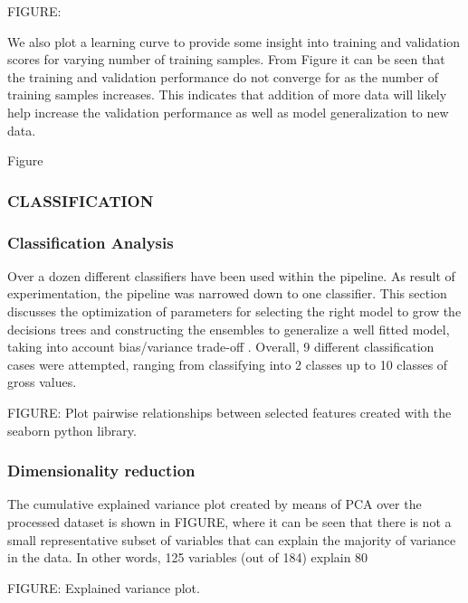 FIGURE:     


We also plot a learning curve to provide some insight into training and validation scores for varying number of training samples. From Figure  it can be seen that the training and validation performance do not converge for as the number of training samples increases. This indicates that addition of  more data will likely help increase the validation performance as well as model generalization to new data.


Figure

\subsubsection{CLASSIFICATION}

\subsubsection{Classification Analysis}
Over a dozen different classifiers have been used within the pipeline. As result of experimentation, the pipeline was narrowed down to one classifier. This section discusses the optimization of parameters for selecting the right model to grow the decisions trees and constructing the ensembles to generalize a well fitted model, taking into account bias/variance trade-off \cite{biasvariance}. Overall, 9 different classification cases were attempted, ranging from classifying into 2 classes up to 10 classes of gross values. 









FIGURE: Plot pairwise relationships between selected features created with the seaborn python library.


\subsubsection{Dimensionality reduction}
The cumulative explained variance plot created by means of PCA over the processed dataset is shown in FIGURE, where it can be seen that there is not a small representative subset of variables that can explain the majority of variance in the data. In other words, 125 variables (out of 184) explain 80%

FIGURE: Explained variance plot.



